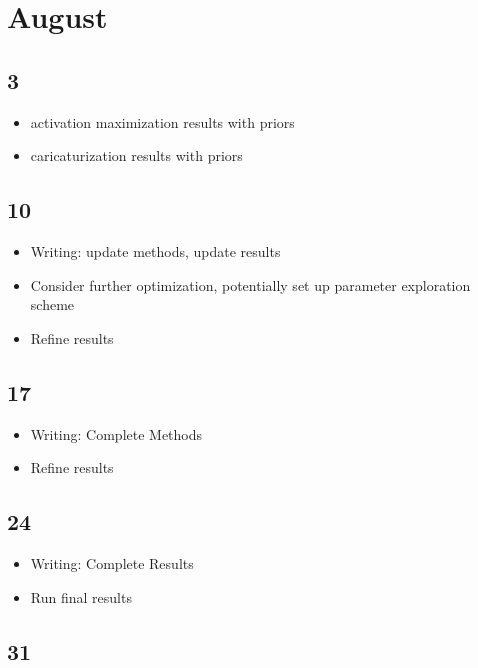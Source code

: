 \documentclass{article}
\begin{document}
\section*{August}

\subsection*{3}

\begin{itemize}
	\item activation maximization results with priors
	\item caricaturization results with priors
\end{itemize}


\subsection*{10}

\begin{itemize}
	\item Writing: update methods, update results
	\item Consider further optimization, potentially set up parameter exploration scheme
	\item Refine results
\end{itemize}

\subsection*{17}

\begin{itemize}
	\item Writing: Complete Methods
	\item Refine results
\end{itemize}

\subsection*{24}

\begin{itemize}
	\item Writing: Complete Results
	\item Run final results
\end{itemize}

\subsection*{31}
\end{document}
